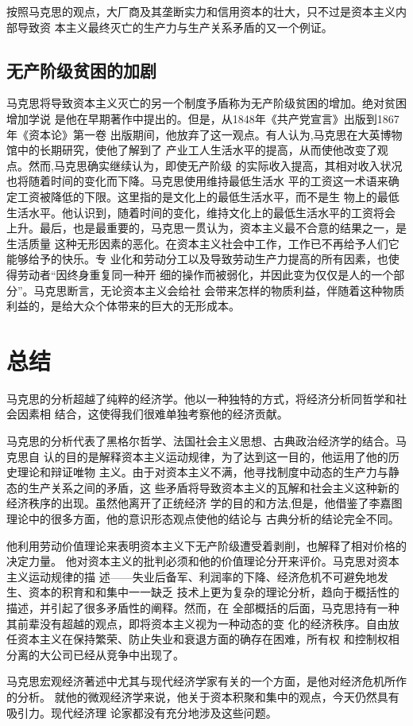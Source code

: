 按照马克思的观点，大厂商及其垄断实力和信用资本的壮大，只不过是资本主义内部导致资
本主义最终灭亡的生产力与生产关系矛盾的又一个例证。

\subsection{无产阶级贫困的加剧}

马克思将导致资本主义灭亡的另一个制度予盾称为无产阶级贫困的增加。绝对贫困增加学说
是他在早期著作中提出的。但是，从1848年《共产党宣言》出版到1867年《资本论》第一卷
出版期间，他放弃了这一观点。有人认为,马克思在大英博物馆中的长期研究，使他了解到了
产业工人生活水平的提高，从而使他改变了观点。然而,马克思确实继续认为，即使无产阶级
的实际收入提高，其相对收入状况也将随着时间的变化而下降。马克思使用维持最低生活水
平的工资这一术语来确定工资被降低的下限。这里指的是文化上的最低生活水平，而不是生
物上的最低生活水平。他认识到，随着时间的变化，维持文化上的最低生活水平的工资将会
上升。最后，也是最重要的，马克思一贯认为，资本主义最不合意的结果之一，是生活质量
这种无形因素的恶化。在资本主义社会中工作，工作已不再给予人们它能够给予的快乐。专
业化和劳动分工以及导致劳动生产力提高的所有因素，也使得劳动者“因终身重复同一种开
细的操作而被弱化，并因此变为仅仅是人的一个部分”。马克思断言，无论资本主义会给社
会带来怎样的物质利益，伴随着这种物质利益的，是给大众个体带来的巨大的无形成本。

\section{总结}

马克思的分析超越了纯粹的经济学。他以一种独特的方式，将经济分析同哲学和社会因素相
结合，这使得我们很难单独考察他的经济贡献。

马克思的分析代表了黑格尔哲学、法国社会主义思想、古典政治经济学的结合。马克思自
认的目的是解释资本主义运动规律，为了达到这一目的，他运用了他的历史理论和辩证唯物
主义。由于对资本主义不满，他寻找制度中动态的生产力与静态的生产关系之间的矛盾，这
些矛盾将导致资本主义的瓦解和社会主义这种新的经济秩序的出现。虽然他离开了正统经济
学的目的和方法,但是，他借鉴了李嘉图理论中的很多方面，他的意识形态观点使他的结论与
古典分析的结论完全不同。

他利用劳动价值理论来表明资本主义下无产阶级遭受着剥削，也解释了相对价格的决定力量。
他对资本主义的批判必须和他的价值理论分开来评价。马克思对资本主义运动规律的描
述——失业后备军、利润率的下降、经济危机不可避免地发生、资本的积育和和集中一一缺乏
技术上更为复杂的理论分析，趋向于概括性的描述，并引起了很多矛盾性的阐释。然而，在
全部概括的后面，马克思持有一种其前辈没有超越的观点，即将资本主义视为一种动态的变
化的经济秩序。自由放任资本主义在保持繁荣、防止失业和衰退方面的确存在困难，所有权
和控制权相分离的大公司已经从竞争中出现了。

马克思宏观经济著述中尤其与现代经济学家有关的一个方面，是他对经济危机所作的分析。
就他的微观经济学来说，他关于资本积聚和集中的观点，今天仍然具有吸引力。现代经济理
论家都没有充分地涉及这些问题。

